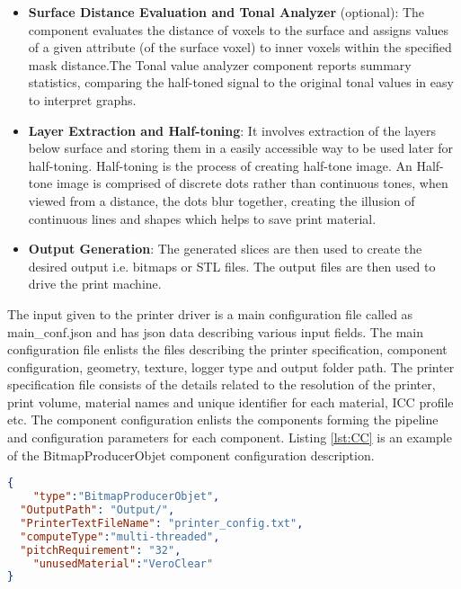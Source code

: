 \begin{itemize}
\item \textbf{Surface Distance Evaluation and Tonal Analyzer} (optional): The component evaluates the distance of voxels to the surface and assigns values of a given attribute (of the surface voxel)  to inner voxels within the specified mask distance.The Tonal value analyzer component reports summary statistics, comparing the half-toned signal to the original tonal values in easy to interpret graphs.\newline

\item \textbf{Layer Extraction and Half-toning}: It involves extraction of the layers below surface and storing them in a easily accessible way to be used later for half-toning. Half-toning is the process of creating half-tone image. An Half-tone image is comprised of discrete dots rather than continuous tones, when viewed from a distance, the dots blur together, creating the illusion of continuous lines and shapes which helps to save print material. \newline

\item \textbf{Output Generation}: The generated slices are then used to create the desired output i.e. bitmaps or STL files. The output files are then used to drive the print machine. \newline

\end{itemize} 

The input given to the printer driver is a main configuration file called as main\_conf.json and has json data describing various input fields. The main configuration file enlists the files describing the printer specification, component configuration, geometry, texture, logger type and output folder path. The printer specification file consists of the details related to the resolution of the printer, print volume, material names and unique identifier for each material, ICC profile etc. The component configuration enlists the components forming the pipeline and configuration parameters for each component. Listing \ref{lst:CC} is an example of the BitmapProducerObjet component configuration description. \newline

\begin{lstlisting}[language=json,label={lst:CC},caption={BitmapProducerObjet Component Configuration}]
{
	"type":"BitmapProducerObjet",
  "OutputPath": "Output/",
  "PrinterTextFileName": "printer_config.txt",
  "computeType":"multi-threaded",
  "pitchRequirement": "32",
	"unusedMaterial":"VeroClear"
}
\end{lstlisting}

